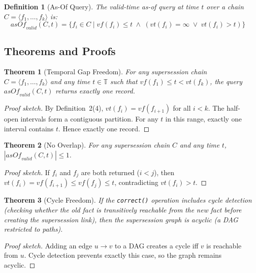 \documentclass{article}
\newtheorem{definition}{Definition}
\newtheorem{theorem}{Theorem}
\begin{document}
\begin{definition}[As-Of Query]
The \emph{valid-time as-of query} at time $t$ over a chain $C = \langle f_1, \ldots, f_k \rangle$ is:
\[
\mathit{asOf}_{\mathit{valid}}(C, t) = \{f_i \in C \mid \mathit{vf}(f_i) \leq t \;\wedge\; (\mathit{vt}(f_i) = \infty \;\vee\; \mathit{vt}(f_i) > t)\}
\]
\end{definition}

\subsection{Theorems and Proofs}

\begin{theorem}[Temporal Gap Freedom]
\label{thm:gapfree}
For any supersession chain $C = \langle f_1, \ldots, f_k \rangle$ and any time $t \in \mathbb{T}$ such that $\mathit{vf}(f_1) \leq t < \mathit{vt}(f_k)$, the query $\mathit{asOf}_{\mathit{valid}}(C, t)$ returns exactly one record.
\end{theorem}

\begin{proof}[Proof sketch]
By Definition~2(4), $\mathit{vt}(f_i) = \mathit{vf}(f_{i+1})$ for all $i < k$. The half-open intervals form a contiguous partition. For any $t$ in this range, exactly one interval contains $t$. Hence exactly one record.
\end{proof}

\begin{theorem}[No Overlap]
\label{thm:nooverlap}
For any supersession chain $C$ and any time $t$, $|\mathit{asOf}_{\mathit{valid}}(C, t)| \leq 1$.
\end{theorem}

\begin{proof}[Proof sketch]
If $f_i$ and $f_j$ are both returned ($i < j$), then $\mathit{vt}(f_i) = \mathit{vf}(f_{i+1}) \leq \mathit{vf}(f_j) \leq t$, contradicting $\mathit{vt}(f_i) > t$.
\end{proof}

\begin{theorem}[Cycle Freedom]
\label{thm:cyclefree}
If the \texttt{correct()} operation includes cycle detection (checking whether the old fact is transitively reachable from the new fact before creating the supersession link), then the supersession graph is acyclic (a DAG restricted to paths).
\end{theorem}

\begin{proof}[Proof sketch]
Adding an edge $u \to v$ to a DAG creates a cycle iff $v$ is reachable from $u$. Cycle detection prevents exactly this case, so the graph remains acyclic.
\end{proof}
\end{document}
